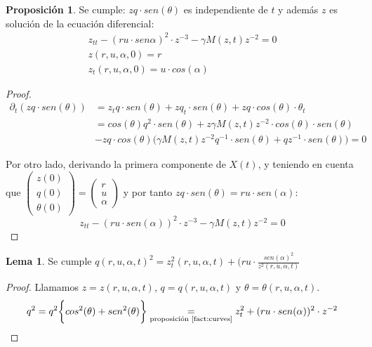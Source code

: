 \documentclass[a4paper,10pt]{scrartcl}
\theoremstyle{definition}
\newtheorem{lemma}{Lema}
\newtheorem{fact}{Proposición}
\numberwithin{equation}{section}
\begin{document}
\begin{fact} \label{fact:curves}
Se cumple:
 $zq \cdot sen(\theta)$ es independiente de $t$ y además $z$ es solución de la ecuación diferencial:
 \begin{align}
 z_{tt} - (ru \cdot sen\alpha)^2 \cdot z^{-3} - \gamma M(z,t) z^{-2} = 0\nonumber\\
 z(r,u,\alpha, 0) = r \nonumber\\
 z_t(r,u,\alpha,0) = u\cdot cos(\alpha)
 \label{eqn:curves}
 \end{align}
\end{fact}
\begin{proof}
 \begin{align*}
  \partial_t(zq \cdot sen(\theta)) &= z_t q\cdot sen(\theta) + zq_t \cdot sen(\theta) + zq \cdot cos(\theta) \cdot \theta_t \\
  &= cos(\theta) q^2 \cdot sen(\theta) + z\gamma M(z,t) z^{-2} \cdot cos(\theta) \cdot sen(\theta) \\
  &- zq \cdot cos(\theta) \Bigg(\gamma M(z,t) z^{-2} q^{-1} \cdot sen(\theta)  + qz^{-1}\cdot sen(\theta) \Bigg) = 0
 \end{align*}

Por otro lado, derivando la primera componente de $X(t)$, y teniendo en cuenta que $\left(\begin{array}{c} z(0)\\ q(0)\\ \theta(0) \end{array}\right) = 
\left(\begin{array}{c} r\\ u\\ \alpha\end{array}\right)$ y por tanto $zq\cdot sen(\theta) = ru\cdot sen(\alpha)$:
\begin{equation}
 z_{tt} - (ru \cdot sen(\alpha))^2 \cdot z^{-3} - \gamma M(z,t) z^{-2} = 0
\end{equation}
\end{proof}

\begin{lemma}\label{lemma:qsquare}
 Se cumple $q(r,u,\alpha,t)^2 = z_t^2(r,u,\alpha,t) + (ru \cdot \frac{sen(\alpha)^2}{z^2(r,u,\alpha,t)}$
\end{lemma}
\begin{proof}
Llamamos $z = z(r,u,\alpha,t)$, $q = q(r,u,\alpha,t)$ y $\theta = \theta(r,u,\alpha,t)$.
 \[
    q^2 = q^2 \bigg\{cos^2(\theta) + sen^2(\theta)\bigg\} \underset{\textrm{proposición \ref{fact:curves}}}{=} z_t^2 + (ru\cdot sen(\alpha))^2 \cdot z^{-2}
 \]
\end{proof}
\end{document}
